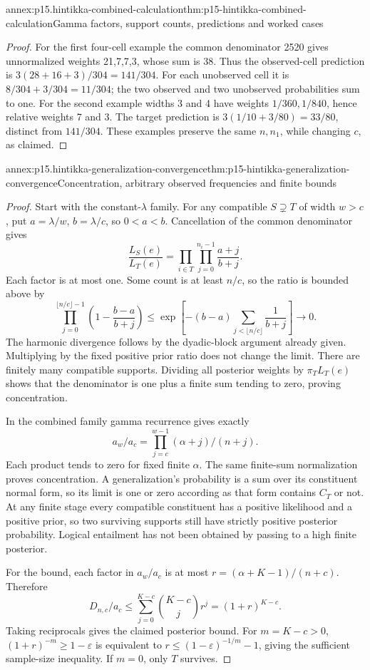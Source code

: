 \begin{annexitem}{annex:p15.hintikka-combined-calculation}{thm:p15-hintikka-combined-calculation}{Gamma factors, support counts, predictions and worked cases}
\begin{proof}
For the first four-cell example the common denominator 2520 gives
unnormalized weights 21,7,7,3, whose sum is 38. Thus the observed-cell
prediction is
\(3(28+16+3)/304=141/304\). For each unobserved cell it is
\(8/304+3/304=11/304\); the two observed and two unobserved
probabilities sum to one. For the second example widths 3 and 4 have
weights \(1/360,1/840\), hence relative weights 7 and 3.
The target prediction is \(3(1/10+3/80)=33/80\), distinct from
\(141/304\). These examples preserve the same \(n,n_1\), while
changing \(c\), as claimed.
\end{proof}
\end{annexitem}

\begin{annexitem}{annex:p15.hintikka-generalization-convergence}{thm:p15-hintikka-generalization-convergence}{Concentration, arbitrary observed frequencies and finite bounds}
\begin{proof}
Start with the constant-\(\lambda\) family. For any compatible
\(S\supsetneq T\) of width \(w>c\), put
\(a=\lambda/w\), \(b=\lambda/c\), so \(0<a<b\).
Cancellation of the common denominator gives
\[
 \frac{L_S(e)}{L_T(e)}
 =\prod_{i\in T}\prod_{j=0}^{n_i-1}\frac{a+j}{b+j}.
\]
Each factor is at most one. Some count is at least \(n/c\), so
the ratio is bounded above by
\[
 \prod_{j=0}^{\lfloor n/c\rfloor-1}
       \left(1-\frac{b-a}{b+j}\right)
 \leq\exp\left[-(b-a)\sum_{j<\lfloor n/c\rfloor}\frac1{b+j}\right]
 \longrightarrow0.
\]
The harmonic divergence follows by the dyadic-block argument already
given. Multiplying by the fixed positive prior ratio does not change
the limit. There are finitely many compatible supports. Dividing all
posterior weights by \(\pi_TL_T(e)\) shows that the denominator
is one plus a finite sum tending to zero, proving concentration.

In the combined family gamma recurrence gives exactly
\[
 a_w/a_c=\prod_{j=c}^{w-1}(\alpha+j)/(n+j).
\]
Each product tends to zero for fixed finite \(\alpha\). The same
finite-sum normalization proves concentration. A generalization's
probability is a sum over its constituent normal form, so its limit
is one or zero according as that form contains \(C_T\) or not.
At any finite stage every compatible constituent has a positive
likelihood and a positive prior, so two surviving supports still have
strictly positive posterior probability. Logical entailment has not
been obtained by passing to a high finite posterior.

For the bound, each factor in \(a_w/a_c\) is at most
\(r=(\alpha+K-1)/(n+c)\). Therefore
\[
 D_{n,c}/a_c\leq
 \sum_{j=0}^{K-c}\binom{K-c}j r^j=(1+r)^{K-c}.
\]
Taking reciprocals gives the claimed posterior bound. For \(m=K-c>0\),
\((1+r)^{-m}\geq1-\varepsilon\) is equivalent to
\(r\leq(1-\varepsilon)^{-1/m}-1\), giving the sufficient
sample-size inequality. If \(m=0\), only \(T\) survives.
\end{proof}
\end{annexitem}

